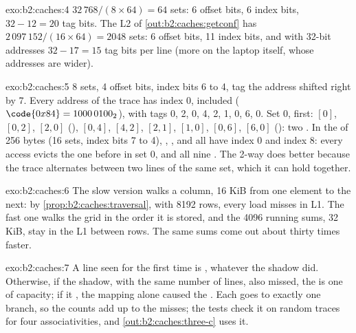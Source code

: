 \begin{solution}{exo:b2:caches:4}
$32\,768 / (8 \times 64) = 64$ sets: 6 offset bits, 6 index bits, $32 - 12 = 20$ tag bits. The L2 of
\cref{out:b2:caches:getconf} has $2\,097\,152 / (16 \times 64) = 2048$ sets: 6 offset bits, 11 index bits, and with
32-bit addresses $32 - 17 = 15$ tag bits per line (more on the laptop itself, whose addresses are wider).
\end{solution}

\begin{solution}{exo:b2:caches:5}
8 sets, 4 offset bits, index bits 6 to 4, tag the address shifted right by 7. Every address of the trace has index 0,
 included ($\code{0x84} = 1000\,0100_2$), with tags 0, 2, 0, 4, 2, 1, 0, 6, 0. Set 0,  first: $[0]$, $[0, 2]$, $[2, 0]$ (), $[0, 4]$, $[4, 2]$, $[2, 1]$, $[1, 0]$, $[0, 6]$, $[6, 0]$ (): two .
In the  of 256 bytes (16 sets, index bits 7 to 4), , ,  and
 all have index 0 and  index 8: every access evicts the one before in set 0, and all nine
. The 2-way  does better because the trace alternates between two lines of the same set, which it can hold
together.
\end{solution}

\begin{solution}{exo:b2:caches:6}
The slow version walks a column, 16 KiB from one element to the next: by \cref{prop:b2:caches:traversal}, with 8192
rows, every load misses in L1. The fast one walks the grid in the order it is stored, and the 4096 running sums,
32 KiB, stay in the L1 between rows. The same sums come out about thirty times faster.
\end{solution}

\begin{solution}{exo:b2:caches:7}
A line seen for the first time is , whatever the shadow did. Otherwise, if the shadow, 
with the same number of lines, also missed, the  is one of capacity; if it , the mapping alone caused the
. Each  goes to exactly one branch, so the counts add up to the misses; the tests check it on random traces
for four associativities, and \cref{out:b2:caches:three-c} uses it.
\end{solution}

